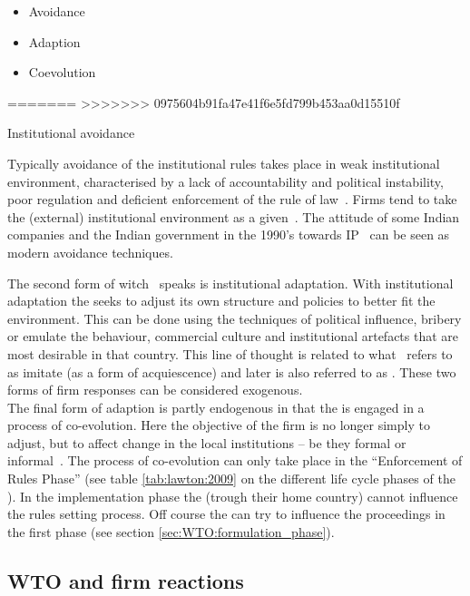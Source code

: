 \begin{itemize}
\item Avoidance
\item Adaption
\item Coevolution
\end{itemize}
=======
>>>>>>> 0975604b91fa47e41f6e5fd799b453aa0d15510f


Institutional avoidance

Typically avoidance of the institutional rules takes place in weak institutional environment, characterised by a lack of accountability and political instability, poor regulation and deficient enforcement of the rule of law~\cite{Cantwell:2009hg}.
Firms tend to take the (external) institutional environment as a given~\cite{Cantwell:2009hg}. The attitude of some Indian \pharma companies and the Indian government in the 1990's towards \gls{IP}~\cite{Times:2013,Chittoor:2009jh} can be seen as modern avoidance techniques.

The second form of witch~\cite{Cantwell:2009hg} speaks is institutional adaptation. 
With institutional adaptation the \mne seeks to adjust its own structure and policies to better fit the environment. 
This can be done using the techniques of political influence, bribery or emulate the behaviour, commercial culture and institutional artefacts that are most desirable in that country. 
This line of thought is related to what~\cite{Oliver:1991tm} refers to as imitate (as a form of acquiescence) and later is also referred to as \iso.
These two forms of firm responses can be considered exogenous.\\
The final form of adaption is partly endogenous in that the \mne is engaged in a process of co-evolution.
Here the objective of the firm is no longer simply to adjust, but to affect change in the local institutions – be they formal or informal~\cite{Cantwell:2009hg}.
The process of co-evolution can only take place in the ``Enforcement of Rules Phase'' (see table \ref{tab:lawton:2009} on the different life cycle phases of the \wto). 
In the implementation phase the \mne (trough their home country) cannot influence the rules setting process.
Off course the \mne can try to influence the proceedings in the first phase (see section \ref{sec:WTO:formulation_phase}). 


\subsection{WTO and firm reactions}

